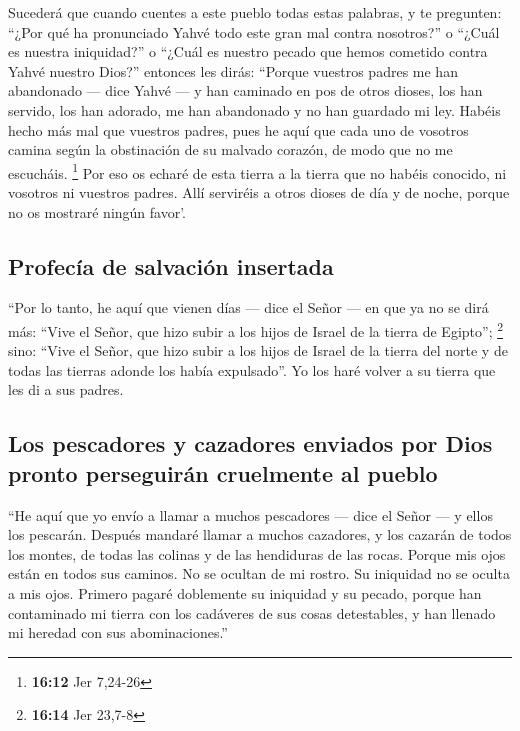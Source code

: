  Sucederá que cuando cuentes a este pueblo todas estas
palabras, y te pregunten: ``¿Por qué ha pronunciado Yahvé todo este gran
mal contra nosotros?'' o ``¿Cuál es nuestra iniquidad?'' o ``¿Cuál es
nuestro pecado que hemos cometido contra Yahvé nuestro Dios?''
 entonces les dirás: ``Porque vuestros padres me han
abandonado --- dice Yahvé --- y han caminado en pos de otros dioses, los
han servido, los han adorado, me han abandonado y no han guardado mi
ley.  Habéis hecho más mal que vuestros padres, pues he
aquí que cada uno de vosotros camina según la obstinación de su malvado
corazón, de modo que no me escucháis. \footnote{\textbf{16:12} Jer
  7,24-26}  Por eso os echaré de esta tierra a la tierra
que no habéis conocido, ni vosotros ni vuestros padres. Allí serviréis a
otros dioses de día y de noche, porque no os mostraré ningún favor'.

\hypertarget{profecuxeda-de-salvaciuxf3n-insertada}{%
\subsection{Profecía de salvación
insertada}\label{profecuxeda-de-salvaciuxf3n-insertada}}

 ``Por lo tanto, he aquí que vienen días --- dice el
Señor --- en que ya no se dirá más: ``Vive el Señor, que hizo subir a
los hijos de Israel de la tierra de Egipto''; \footnote{\textbf{16:14}
  Jer 23,7-8}  sino: ``Vive el Señor, que hizo subir a
los hijos de Israel de la tierra del norte y de todas las tierras adonde
los había expulsado''. Yo los haré volver a su tierra que les di a sus
padres.

\hypertarget{los-pescadores-y-cazadores-enviados-por-dios-pronto-perseguiruxe1n-cruelmente-al-pueblo}{%
\subsection{Los pescadores y cazadores enviados por Dios pronto
perseguirán cruelmente al
pueblo}\label{los-pescadores-y-cazadores-enviados-por-dios-pronto-perseguiruxe1n-cruelmente-al-pueblo}}

 ``He aquí que yo envío a llamar a muchos pescadores ---
dice el Señor --- y ellos los pescarán. Después mandaré llamar a muchos
cazadores, y los cazarán de todos los montes, de todas las colinas y de
las hendiduras de las rocas.  Porque mis ojos están en
todos sus caminos. No se ocultan de mi rostro. Su iniquidad no se oculta
a mis ojos.  Primero pagaré doblemente su iniquidad y su
pecado, porque han contaminado mi tierra con los cadáveres de sus cosas
detestables, y han llenado mi heredad con sus abominaciones.''

